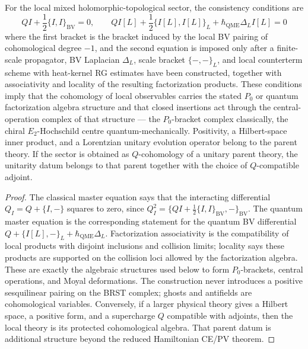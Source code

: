 \documentclass[11pt]{memoir}
\begin{document}
\begin{thm}
  \label{thm:bv-replacement-unitarity}
  For the local mixed holomorphic-topological sector, the consistency
  conditions are
  \[
    QI+\frac12\{I,I\}_{\mathrm{BV}}=0,\qquad
    QI[L]+\frac12\{I[L],I[L]\}_L+\hbar_{\mathrm{QME}}\Delta_L I[L]=0
  \]
  where the first bracket is the bracket induced by the local BV pairing
  of cohomological degree \(-1\), and the second equation is imposed
  only after a finite-scale propagator, BV Laplacian \(\Delta_L\), scale
  bracket \(\{-,-\}_L\), and local counterterm scheme with heat-kernel
  RG estimates have been constructed, together with
  associativity and locality of the resulting factorization products.
  These conditions imply that the cohomology of local observables carries
  the stated \(P_0\) or quantum factorization algebra structure and that
  closed insertions act through the central-operation complex of that
  structure --- the \(P_0\)-bracket complex classically, the chiral
  \(E_2\)-Hochschild centre quantum-mechanically.
  Positivity, a Hilbert-space inner product, and a Lorentzian unitary
  evolution operator belong to the parent theory.  If the sector is obtained as \(Q\)-cohomology of a unitary
  parent theory, the unitarity datum belongs to that parent together
  with the choice of \(Q\)-compatible adjoint.
\end{thm}

\begin{proof}
  The classical master equation says that the interacting differential
  \(Q_I=Q+\{I,-\}\) squares to zero, since
  \(Q_I^2=\{QI+\frac12\{I,I\}_{\mathrm{BV}},-\}_{\mathrm{BV}}\).  The quantum master equation is the
  corresponding statement for the quantum BV differential
  \(Q+\{I[L],-\}_L+\hbar_{\mathrm{QME}}\Delta_L\).  Factorization associativity is the
  compatibility of local products with disjoint inclusions and collision
  limits; locality says these products are supported on the collision
  loci allowed by the factorization algebra. These are exactly the
  algebraic structures used below to form \(P_0\)-brackets, central
  operations, and Moyal deformations. The construction never introduces a
  positive sesquilinear pairing on the BRST complex; ghosts and
  antifields are cohomological variables. Conversely, if a larger
  physical theory gives a Hilbert space, a positive form, and a
  supercharge \(Q\) compatible with adjoints, then the local theory is
  its protected cohomological algebra. That parent datum is additional
  structure beyond the reduced Hamiltonian CE/PV theorem.
\end{proof}
\end{document}
